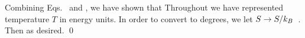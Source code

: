 {	Combining Eqs.~ and , we have shown that
	Throughout we have represented temperature $T$ in energy units.  In order to convert to degrees, we let $S \to S / k_B$~\cite[p.~35]{Landau}.  Then
	as desired. \qed
}